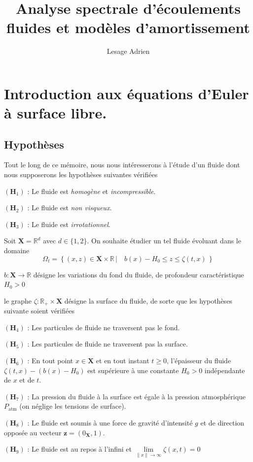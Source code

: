 \documentclass[12pt,a4paper]{article}
\numberwithin{equation}{section}
\begin{document}
\title{Analyse spectrale d'écoulements fluides et modèles d'amortissement}
\author{Lesage Adrien}
\maketitle
\newpage
\tableofcontents
\newpage
\section{Introduction aux équations d'Euler à surface libre.}
\subsection{Hypothèses}

Tout le long de ce mémoire, nous nous intéresserons à l'étude d'un fluide dont nous supposerons les hypothèses suivantes vérifiées
\begin{list}{}{}
    \item[$(\textbf{H}_1)$ : ] Le fluide est \textit{homogène} et \textit{incompressible}.
    \item[$(\textbf{H}_2)$ : ] Le fluide est \textit{non visqueux}.
    \item[$(\textbf{H}_3)$ : ] Le fluide est \textit{irrotationnel}.
\end{list}

Soit $\textbf{X} = \mathbb{R}^d$ avec $d \in \{1,2\}$. On souhaite étudier un tel fluide évoluant dans le domaine $$\Omega_t = \left\{ (x,z) \in \textbf{X}\times\mathbb{R}  \,|\quad b(x) - H_0 \leq z \leq \zeta(t,x) \,\right\}$$
\begin{list}{}{}
\item[\textbullet] $b : \textbf{X}\rightarrow \mathbb{R}$ désigne les variations du fond du fluide, de profondeur caractéristique $H_0 > 0$
\item[\textbullet] le graphe $\zeta : \mathbb{R}_+\times \textbf{X}$ désigne la surface du fluide, de sorte que les hypothèses suivante soient vérifiées
\end{list}
\begin{list}{}{}
    \item[$(\textbf{H}_4)$ : ] Les particules de fluide ne traversent pas le fond.
    \item[$(\textbf{H}_5)$ : ] Les particules de fluide ne traversent pas la surface.
    \item[$(\textbf{H}_6)$ : ]  En tout point $x\in\textbf{X}$ et en tout instant $t\geq 0$, l'épaisseur du fluide $\zeta(t,x) - (b(x)-H_0)$ est supérieure à une constante $H_0>0$ indépendante de $x$ et de $t$.
    \item[$(\textbf{H}_7)$ : ] La pression  du fluide à la surface est égale à la pression atmosphérique $P_{\text{atm}}$ (on néglige les tensions de surface).
    \item[$(\textbf{H}_8)$ : ] Le fluide est soumis à une force de gravité d'intensité $g$ et de direction opposée au vecteur $\textbf{z} = (0_{\textbf{X}},1)$.
    \item[$(\textbf{H}_9)$ : ] Le fluide est au repos à l'infini et $\lim\limits_{\|x\|\rightarrow \infty}\zeta(x,t) = 0$
\end{list}
\end{document}
